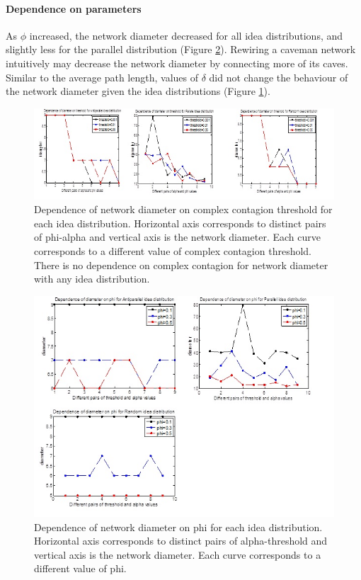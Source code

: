 \paragraph{Dependence on parameters}
As $\phi$ increased, the network diameter decreased for all idea distributions, and slightly less for the parallel distribution (Figure \ref{fig15}). Rewiring a caveman network intuitively may decrease the network diameter by connecting more of its caves.
Similar to the average path length, values of $\delta$ did not change the behaviour of the network diameter given the idea distributions (Figure \ref{fig18}).

\begin{figure}
[htp]
\begin{center}
\includegraphics{Fig18}
\end{center}
\caption{ Dependence of network diameter on complex contagion threshold for each idea distribution. Horizontal axis corresponds to distinct pairs of phi-alpha and vertical axis is the network diameter. Each curve corresponds to a different value of complex contagion threshold. There is no dependence on complex contagion for network diameter with any idea distribution.}
\label {fig18}
\end{figure}

\begin{figure}
[htp]
\begin{center}
\includegraphics{Fig15}
\end{center}
\caption {Dependence of network diameter on phi for each idea distribution. Horizontal axis corresponds to distinct pairs of alpha-threshold and vertical axis is the network diameter. Each curve corresponds to a different value of phi. }
\label {fig15}
\end{figure}




